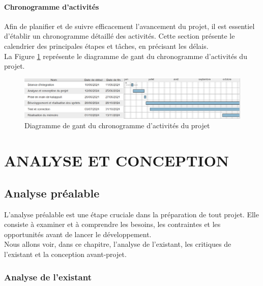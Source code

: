 \documentclass[12pt]{report}
\begin{document}
				\subsection{Chronogramme d'activités}

				\hspace{15pt} Afin de planifier et de suivre efficacement l'avancement du projet, il est essentiel d'établir un chronogramme détaillé des activités. Cette section présente le calendrier des principales étapes et tâches, en précisant les délais.\\

				 La Figure \ref{fig:Chronogramme} représente le diagramme de gant du chronogramme d'activités du projet.

				\begin{figure}[h]
					\centering
					\includegraphics[width=\textwidth]{image6.png}
					\caption{Diagramme de gant du chronogramme d'activités du projet}
					\label{fig:Chronogramme}
				\end{figure}
				\FloatBarrier







				\part{ANALYSE ET CONCEPTION}
				\chapter{Analyse préalable}
				
				\hspace{15pt}L'analyse préalable est une étape cruciale dans la préparation de tout projet. Elle consiste à examiner et à comprendre les besoins, les contraintes et les opportunités avant de lancer le développement.\\

				 Nous allons voir, dans ce chapitre, l’analyse de l’existant, les critiques de l’existant et la conception avant-projet.

				\section{Analyse de l'existant}
				
\end{document}
